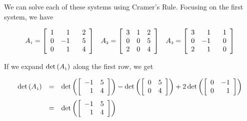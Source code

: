 We can solve each of these systems using Cramer's Rule.  Focusing on the first system, we have 

\[ \begin{array}{ccc}

A_{\mbox{\tiny$1$}} = \left[ \begin{array}{rrr} 1 & 1 & \hphantom{-}2 \\ 0 & -1 & 5 \\ 0 & 1 & 4 \\ \end{array} \right]

&

A_{\mbox{\tiny$2$}} = \left[ \begin{array}{rrr} 3 &  1 & 2 \\ 0 & 0 & 5 \\ 2 & 0 & 4 \\ \end{array} \right]

&

A_{\mbox{\tiny$3$}} = \left[ \begin{array}{rrr} 3 &  1 & \hphantom{-}1 \\ 0 & -1 & 0 \\ 2 & 1 & 0 \\ \end{array} \right]

\end{array} \]

If we expand $\det\left(A_{\mbox{\tiny$1$}}\right)$ along the first row, we get

\[ \begin{array}{rcl}

 \det\left(A_{\mbox{\tiny$1$}}\right) & = &  \det\left( \left[ \begin{array}{rr} -1 & 5 \\ 1 & 4 \\ \end{array} \right] \right) - \det\left( \left[ \begin{array}{rr} 0 & 5 \\ 0 & 4 \\ \end{array} \right] \right) + 2 \det\left( \left[ \begin{array}{rr} 0 & -1 \\ 0 & 1 \\ \end{array} \right] \right) \\ [13pt]
                        
                      & = & \det\left( \left[ \begin{array}{rr} -1 & 5 \\ 1 & 4 \\ \end{array} \right] \right)
                        
\end{array} \]

